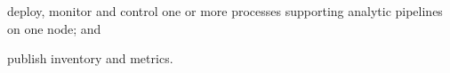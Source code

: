 \begin{description}
  \item deploy, monitor and control one or more  processes supporting analytic
  pipelines on one node; and
  \item publish inventory and metrics.
\end{description}